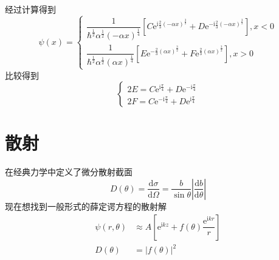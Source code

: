 \documentclass[12pt, a4paper, oneside]{ctexart}
\begin{document}
	\quad\quad 经过计算得到
	\begin{equation}
		\psi(x)=\left\{\begin{matrix}
			\dfrac{1}{\hbar^{\frac{1}{2}}\alpha^{\frac{1}{2}}(-\alpha x)^{\frac{1}{4}}}\left[C\mathrm{e}^{\mathrm{i}\frac{2}{3}(-\alpha x)^{\frac{3}{2}}}+D\mathrm{e}^{-\mathrm{i}\frac{2}{3}(-\alpha x)^{\frac{3}{2}}}\right],x<0	\\\dfrac{1}{\hbar^{\frac{1}{2}}\alpha^{\frac{1}{2}}(\alpha x)^{\frac{1}{4}}}\left[E\mathrm{e}^{-\frac{2}{3}(\alpha x)^{\frac{3}{2}}}+F\mathrm{e}^{\frac{2}{3}(\alpha x)^{\frac{3}{2}}}\right],x>0
		\end{matrix}\right.
	\end{equation}
	\quad\quad 比较得到
	\begin{equation}
		\left\{\begin{matrix}
		2E=C\mathrm{e}^{\mathrm{i}\frac{\pi}{4}}+D\mathrm{e}^{-\mathrm{i}\frac{\pi}{4}}	\\2F=C\mathrm{e}^{-\mathrm{i}\frac{\pi}{4}}+D\mathrm{e}^{\mathrm{i}\frac{\pi}{4}}
		\end{matrix}\right.
	\end{equation}
	\section{散射}
	在经典力学中定义了微分散射截面
	\begin{equation}
		D(\theta)=\dfrac{\mathrm{d}\sigma}{\mathrm{d}\Omega}=\dfrac{b}{\sin\theta}\left|\dfrac{\mathrm{d}b}{\mathrm{d}\theta}\right|
	\end{equation}
	\quad\quad 现在想找到一般形式的薛定谔方程的散射解
	\begin{align}
		\psi(r,\theta)&\approx A\left[\mathrm{e}^{\mathrm{i}kz}+f(\theta)\dfrac{\mathrm{e}^{\mathrm{i}kr}}{r}\right]\\
		D(\theta)&=\left|f(\theta)\right|^{2}
	\end{align}
\end{document}

